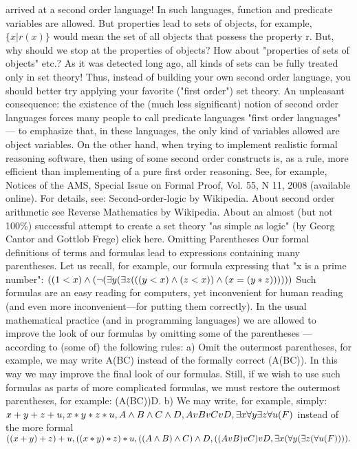 arrived at a second order language! In such languages, function and predicate variables are allowed. But properties lead to
sets of objects, for example, \(\{x | r(x)\}\) would mean the set of all objects that possess the property r. But, why should we stop at
the properties of objects? How about "properties of sets of objects" etc.? As it was detected long ago, all kinds of sets can be
fully treated only in set theory! Thus, instead of building your own second order language, you should better try applying your
favorite ("first order") set theory. An unpleasant consequence: the existence of the (much less significant) notion of second
order languages forces many people to call predicate languages "first order languages" --- to emphasize that, in these
languages, the only kind of variables allowed are object variables.
On the other hand, when trying to implement realistic formal reasoning software, then using of some second order constructs
is, as a rule, more efficient than implementing of a pure first order reasoning. See, for example, Notices of the AMS, Special
Issue on Formal Proof, Vol. 55, N 11, 2008 (available online).
For details, see: Second-order-logic by Wikipedia. About second order arithmetic see Reverse Mathematics by Wikipedia.
About an almost (but not 100\%) successful attempt to create a set theory "as simple as logic" (by Georg Cantor and Gottlob
Frege) click here.
Omitting Parentheses
Our formal definitions of terms and formulas lead to expressions containing many parentheses. Let us
recall, for example, our formula expressing that "x is a prime number":
\(((1<x)\wedge (\neg (\exists y(\exists z(((y<x)\wedge (z<x))\wedge (x=(y*z))))))\)
Such formulas are an easy reading for computers, yet inconvenient for human reading (and even more
inconvenient---for putting them correctly). In the usual mathematical practice (and in programming
languages) we are allowed to improve the look of our formulas by omitting some of the parentheses ---
according to (some of) the following rules:
a) Omit the outermost parentheses, for example, we may write A\IMPLIES (B\IMPLIES C) instead of the formally correct
(A\IMPLIES (B\IMPLIES C)). In this way we may improve the final look of our formulas. Still, if we wish to use such
formulas as parts of more complicated formulas, we must restore the outermost parentheses, for example:
(A\IMPLIES (B\IMPLIES C))\IMPLIES D.
b) We may write, for example, simply:
\(x+y+z+u, x*y*z*u, A\wedge B\wedge C\wedge D, AvBvCvD, \exists x\forall y\exists z\forall u(F)\)
instead of the more formal
\(((x+y)+z)+u, ((x*y)*z)*u, ((A\wedge B)\wedge C)\wedge D, ((AvB)vC)vD, \exists x(\forall y(\exists z(\forall u(F)))).\)
